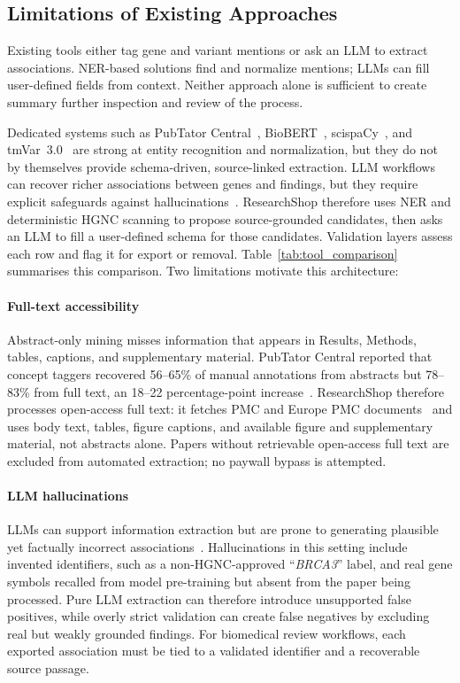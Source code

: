 \subsection{Limitations of Existing Approaches}
Existing tools either tag gene and variant mentions or ask an LLM to extract associations. NER-based solutions find and normalize mentions; LLMs can fill user-defined fields from context. Neither approach alone is sufficient to create summary further inspection and review of the process.

Dedicated systems such as PubTator Central~\cite{wei2019pubtatorcentral}, BioBERT~\cite{lee2020biobert}, scispaCy~\cite{neumann2019scispacy}, and tmVar~3.0~\cite{wei2022tmvar3} are strong at entity recognition and normalization, but they do not by themselves provide schema-driven, source-linked extraction. LLM workflows can recover richer associations between genes and findings, but they require explicit safeguards against hallucinations~\cite{ji2023hallucination,farquhar2024semanticentropy}. ResearchShop therefore uses NER and deterministic HGNC scanning to propose source-grounded candidates, then asks an LLM to fill a user-defined schema for those candidates. Validation layers assess each row and flag it for export or removal. Table~\ref{tab:tool_comparison} summarises this comparison. Two limitations motivate this architecture:

\paragraph{Full-text accessibility} Abstract-only mining misses information that appears in Results, Methods, tables, captions, and supplementary material. PubTator Central reported that concept taggers recovered 56--65\% of manual annotations from abstracts but 78--83\% from full text, an 18--22 percentage-point increase~\cite{wei2019pubtatorcentral}. ResearchShop therefore processes open-access full text: it fetches PMC and Europe PMC documents~\cite{europepmc2015} and uses body text, tables, figure captions, and available figure and supplementary material, not abstracts alone. Papers without retrievable open-access full text are excluded from automated extraction; no paywall bypass is attempted.

\paragraph{LLM hallucinations} LLMs can support information extraction but are prone to generating plausible yet factually incorrect associations~\cite{farquhar2024semanticentropy}. Hallucinations in this setting include invented identifiers, such as a non-HGNC-approved ``\textit{BRCA3}'' label, and real gene symbols recalled from model pre-training but absent from the paper being processed. Pure LLM extraction can therefore introduce unsupported false positives, while overly strict validation can create false negatives by excluding real but weakly grounded findings. For biomedical review workflows, each exported association must be tied to a validated identifier and a recoverable source passage.

